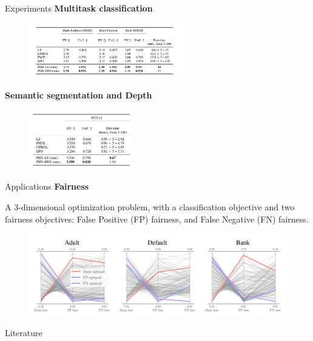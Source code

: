 \documentclass[13pt]{beamer}				\usepackage{graphicx}
\begin{document}
\begin{frame}{Experiments}
\textbf{Multitask classification}
\begin{figure}[h!]
    \includegraphics[width=0.6\textwidth, trim={0 0 0 0cm},clip]{images/phn_class.png}
\end{figure}
\textbf{Semantic segmentation and Depth}
\begin{figure}[h!]
    \includegraphics[width=0.4\textwidth, trim={0 0 0 0cm},clip]{images/phn_depth.png}
\end{figure}
\end{frame}

\begin{frame}{Applications}
\textbf{Fairness}

A 3-dimensional optimization problem, with a classification objective and two fairness objectives: False Positive (FP) fairness, and False Negative (FN) fairness.
\begin{figure}[h!]
    \includegraphics[width=1\textwidth, trim={0 0 0 0cm},clip]{images/fairness.png}
\end{figure}
\end{frame}

\begin{frame}{Literature}
\nocite{phn}
\printbibliography
\end{frame}
\end{document}
